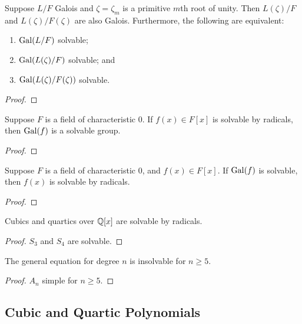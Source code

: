 \begin{lemma}
    Suppose \(L/F\) Galois and \(\zeta = \zeta_m\) is a primitive \(m\)th root of unity.
    Then \(L(\zeta)/F\) and \(L(\zeta)/F(\zeta)\) are also Galois.
    Furthermore, the following are equivalent:
    \begin{enumerate}[label={(\alph*)}, itemsep=0mm]
        \item \(\operatorname{Gal}(L/F)\) solvable;
        \item \(\operatorname{Gal}(L(\zeta)/F)\) solvable; and
        \item \(\operatorname{Gal}(L(\zeta)/F(\zeta))\) solvable.
    \end{enumerate}
\end{lemma}
\begin{proof}
\end{proof}

\begin{theorem}
    Suppose \(F\) is a field of characteristic 0.
    If \(f(x) \in F[x]\) is solvable by radicals,
    then \(\operatorname{Gal}(f)\) is a solvable group.
\end{theorem}
\begin{proof}
\end{proof}
\begin{theorem}[Galois]
    Suppose \(F\) is a field of characteristic 0,
    and \(f(x) \in F[x]\).
    If \(\operatorname{Gal}(f)\) is solvable, then \(f(x)\) is solvable by radicals.
\end{theorem}
\begin{proof}
\end{proof}
\begin{corollary}
    Cubics and quartics over \(\mathbb{Q}[x]\) are solvable by radicals.
\end{corollary}
\begin{proof}
    \(S_3\) and \(S_4\) are solvable.
\end{proof}
\begin{corollary}
    The general equation for degree \(n\) is insolvable for \(n \geq 5\).
\end{corollary}
\begin{proof}
    \(A_n\) simple for \(n \geq 5\).
\end{proof}


\subsection{Cubic and Quartic Polynomials}
